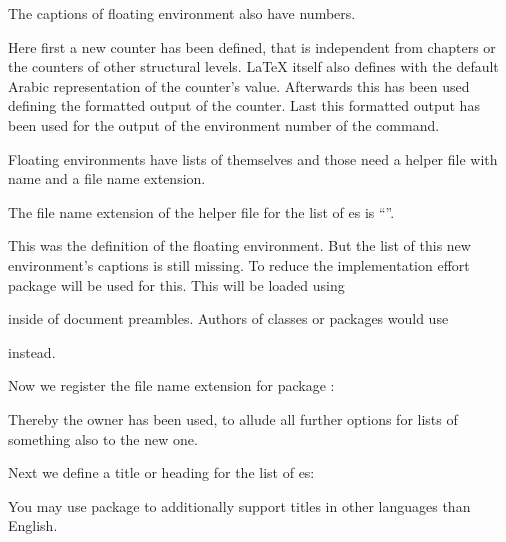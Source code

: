 The captions of floating environment also have numbers.
\begin{lstcode}[belowskip=\dp\strutbox plus 1pt]
  \newcommand*{\remarkboxformat}{%
    Remark~\theremarkbox\csname autodot\endcsname}
  \newcommand*{\fnum@remarkbox}{\remarkboxformat}
\end{lstcode}
Here first a new counter has been defined, that is independent from chapters
or the counters of other structural levels. \LaTeX{} itself also defines
 with the default Arabic representation of the counter's
value. Afterwards this has been used defining the formatted output of the
counter. Last this formatted output has been used for the output of the
environment number of the  command.

Floating environments have lists of themselves
and those need a helper file with name  and a file name
extension.
\begin{lstcode}[belowskip=\dp\strutbox plus 1pt]
  \newcommand*{\ext@remarkbox}{lor}
\end{lstcode}
The file name extension of the helper file for the list of
es is ``''.

This was the definition of the floating environment. But the list of this new
environment's captions is still missing. To reduce the implementation effort
package  will be used for this. This will be loaded using
\begin{lstcode}[belowskip=\dp\strutbox plus 1pt]
  \usepackage{tocbasic}
\end{lstcode}
inside of document preambles. Authors of classes or packages would use
\begin{lstcode}[belowskip=\dp\strutbox plus 1pt]
  \RequirePackage{tocbasic}
\end{lstcode}
instead.

Now we register the file name extension for package
:
\begin{lstcode}[belowskip=\dp\strutbox plus 1pt]
\end{lstcode}
Thereby the owner  has been used, to allude all further
\KOMAScript{} options for lists of something also to the new one.

Next we define a title or heading for the list of
es:
\begin{lstcode}[belowskip=\dp\strutbox plus 1pt]
  \newcommand*{\listoflorname}{List of Remarks}
\end{lstcode}
You may use package  to additionally support titles in other
languages than English.

